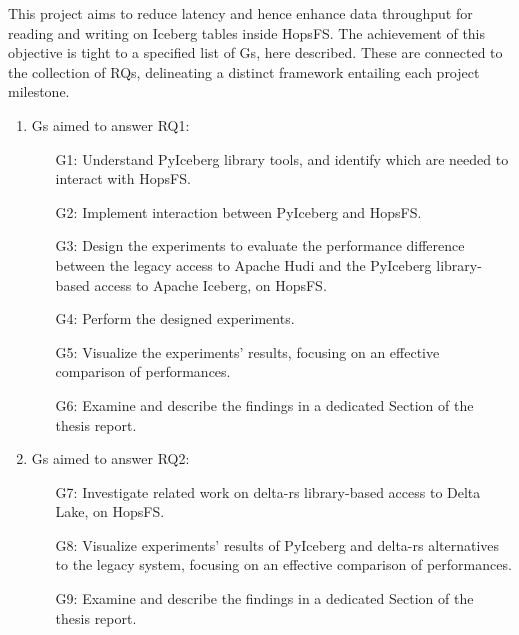 This project aims to reduce latency and hence enhance data throughput for reading and writing on Iceberg tables inside \gls{HopsFS}. The achievement of this objective is tight to a specified list of \glspl{G}, here described. These are connected to the collection of \glspl{RQ}, delineating a distinct framework entailing each project milestone.

\begin{enumerate}
    \item \glspl{G} aimed to answer RQ1: 
        \begin{enumerate}
            \item[G1:] Understand PyIceberg library tools, and identify which are needed to interact with \gls{HopsFS}.
            \item[G2:] Implement interaction between PyIceberg and \gls{HopsFS}.
            \item[G3:] Design the experiments to evaluate the performance difference between the legacy access to Apache Hudi and the PyIceberg library-based access to Apache Iceberg, on \gls{HopsFS}. 
            \item[G4:] Perform the designed experiments.
            \item[G5:] Visualize the experiments' results, focusing on an effective comparison of performances.
            \item[G6:] Examine and describe the findings in a dedicated Section of the thesis report.
        \end{enumerate}
    \item \glspl{G} aimed to answer RQ2:
        \begin{enumerate}
            \item[G7:] Investigate related work on delta-rs library-based access to Delta Lake, on \gls{HopsFS}.
            \item[G8:] Visualize experiments' results of PyIceberg and delta-rs alternatives to the legacy system, focusing on an effective comparison of performances.
            \item[G9:] Examine and describe the findings in a dedicated Section of the thesis report.
        \end{enumerate}
\end{enumerate}

